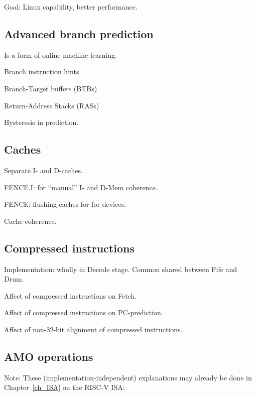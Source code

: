 Goal: Linux capability, better performance.


\subsection{Advanced branch prediction}

Is a form of online machine-learning.

Branch instruction hints.

Branch-Target buffers (BTBs)

Return-Address Stacks (RASs)

Hysteresis in prediction.


\subsection{Caches}

Separate I- and D-caches.

FENCE.I: for ``manual'' I- and D-Mem coherence.

FENCE: flushing caches for for devices.

Cache-coherence.


\subsection{Compressed instructions}

Implementation: wholly in Decode stage.  Common shared between Fife and Drum.

Affect of compressed instructions on Fetch.

Affect of compressed instructions on PC-prediction.

Affect of non-32-bit alignment of compressed instructions.


\subsection{AMO operations}

Note: These (implementation-independent) explanations may already be
done in Chapter~\ref{ch_ISA} on the RISC-V ISA:

